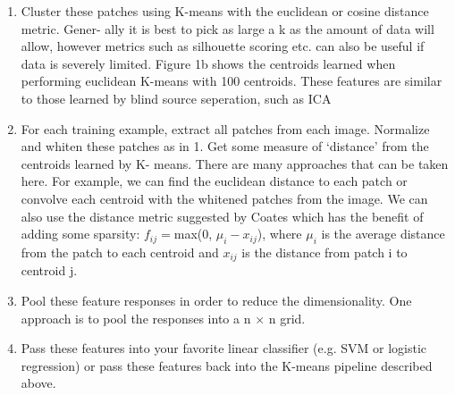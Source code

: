 \documentclass{article} %
\begin{document}
\begin{enumerate}
\begin{figure}
\begin{subfigure}[h]{0.45\columnwidth}
    \caption{100 centroids learned from applying K-means to 8x8 patches extracted from natural images. Notice the similarity to Gabor wavelets.}
    \label{fig_centroids}
  \end{subfigure}
\end{figure}
  
  This means that we do not waste learning resources learning unneccessary imformation, such as knowing that neighboring pixels are more likely to have similar colors.
In Figure 1a we show the eigenvectors we extract when performing PCA/ZCA. We see that each eigenvector corresponds to a different frequency basis. These eigenvectors are very similar to those from the discrete cosine transform (DCT), which is often used in image compression. \\
\\
We can also optionally use PCA to reduce the dimensionality of the data. This doesn’t help with accuracy of the quality of features learned, but it does speed up the pipeline significantly.

  \item Cluster these patches using K-means with the euclidean or cosine distance metric. Gener- ally it is best to pick as large a k as the amount of data will allow, however metrics such as silhouette scoring etc. can also be useful if data is severely limited. Figure 1b shows the centroids learned when performing euclidean K-means with 100 centroids. These features are similar to those learned by blind source seperation, such as ICA \cite{hoyer}
  
  \item For each training example, extract all patches from each image. Normalize and whiten these patches as in 1. Get some measure of ‘distance’ from the centroids learned by K- means. There are many approaches that can be taken here. For example, we can find the euclidean distance to each patch or convolve each centroid with the whitened patches from the image. We can also use the distance metric suggested by Coates which has the benefit of adding some sparsity: $f_{ij} = $max(0, $\mu_i - x_{ij}$), where $\mu_i$ is the average distance from the patch to each centroid and $x_{ij}$ is the distance from patch i to centroid j.
  
  \item Pool these feature responses in order to reduce the dimensionality. One approach is to pool the responses into a n $\times$ n grid.
  
  \item Pass these features into your favorite linear classifier (e.g. SVM or logistic regression) or pass these features back into the K-means pipeline described above.
\end{enumerate}

\newpage



\end{document}
